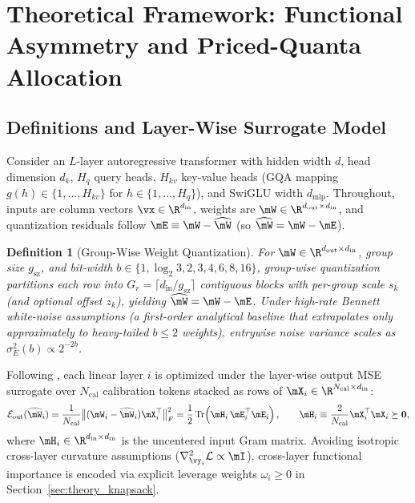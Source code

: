 \documentclass[10pt]{article} %
\newtheorem{definition}{Definition}
\begin{document}
\section{Theoretical Framework: Functional Asymmetry and Priced-Quanta Allocation}
\label{sec:theory}

\subsection{Definitions and Layer-Wise Surrogate Model}
\label{sec:theory_defs}

Consider an $L$-layer autoregressive transformer with hidden width $d$, head dimension $d_k$, $H_q$ query heads, $H_{kv}$ key-value heads (GQA mapping $g(h) \in \{1,\dots,H_{kv}\}$ for $h \in \{1,\dots,H_q\}$), and SwiGLU width $d_{\text{mlp}}$. Throughout, inputs are column vectors $\vx \in \R^{d_{\text{in}}}$, weights are $\mW \in \R^{d_{\text{out}} \times d_{\text{in}}}$, and quantization residuals follow $\mE \equiv \mW - \widehat{\mW}$ (so $\widehat{\mW} = \mW - \mE$).

\begin{definition}[Group-Wise Weight Quantization]
\label{def:quant}
For $\mW \in \R^{d_{\text{out}} \times d_{\text{in}}}$, group size $g_{\text{sz}}$, and bit-width $b \in \{1, \log_2 3, 2, 3, 4, 6, 8, 16\}$, group-wise quantization partitions each row into $G_r = \lceil d_{\text{in}} / g_{\text{sz}} \rceil$ contiguous blocks with per-group scale $s_k$ (and optional offset $z_k$), yielding $\widehat{\mW} = \mW - \mE$. Under high-rate Bennett white-noise assumptions (a first-order analytical baseline that extrapolates only approximately to heavy-tailed $b \le 2$ weights), entrywise noise variance scales as $\sigma_E^2(b) \propto 2^{-2b}$.
\end{definition}

Following \citet{frantar2023gptq}, each linear layer $i$ is optimized under the layer-wise output MSE surrogate over $N_{\text{cal}}$ calibration tokens stacked as rows of $\mX_i \in \R^{N_{\text{cal}} \times d_{\text{in}}}$:
\begin{equation}
    \mathcal{E}_{\text{out}}(\widehat{\mW}_i)
    = \frac{1}{N_{\text{cal}}} \big\| (\mW_i - \widehat{\mW}_i)\mX_i^\top \big\|_F^2
    = \frac{1}{2}\,\mathrm{Tr}\!\left(\mH_i\,\mE_i^\top \mE_i\right),
    \qquad
    \mH_i \equiv \frac{2}{N_{\text{cal}}}\mX_i^\top \mX_i \succeq \mathbf{0},
    \label{eq:hessian_loss}
\end{equation}
where $\mH_i \in \R^{d_{\text{in}} \times d_{\text{in}}}$ is the uncentered input Gram matrix. Avoiding isotropic cross-layer curvature assumptions ($\nabla^2_{\vy_i}\mathcal{L} \propto \mI$), cross-layer functional importance is encoded via explicit leverage weights $\omega_i \ge 0$ in Section~\ref{sec:theory_knapsack}.
\end{document}
